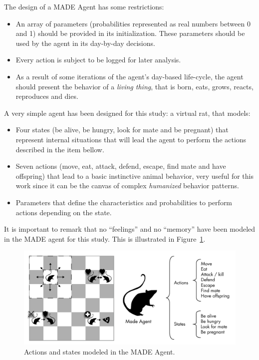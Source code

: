\documentclass[letterpaper]{article}
\begin{document}
The design of a MADE Agent has some restrictions:
\begin{itemize}
\item An array of parameters (probabilities represented as real numbers between 0 and 1) should be provided in its initialization. These parameters should be used by the agent in its day-by-day decisions.
\item Every action is subject to be logged for later analysis.
\item As a result of some iterations of the agent's day-based life-cycle, the agent should present the behavior of a \textit{living thing}, that is born, eats, grows, reacts, reproduces and dies.  
\end{itemize}

A very simple agent has been designed for this study: a virtual
rat, that models:
\begin{itemize}
\item Four states (be alive, be hungry, look for
mate and be pregnant) that represent internal situations that will lead the
agent to perform the actions described in the item bellow.
\item Seven actions (move, eat, attack, defend, escape,
find mate and have offspring) that lead to a basic instinctive animal
behavior, very useful for this work since it can be the canvas of 
complex \textit{humanized} behavior patterns.
\item Parameters that define the characteristics and probabilities to
perform actions depending on the state.
\end{itemize}
It is important to remark that no ``feelings'' and no ``memory''
have been modeled in the MADE agent for this study. This is
illustrated in Figure~\ref{fig:madeAgent}.

\begin{figure}
\begin{center}
\includegraphics[scale=0.35]{img/MadeAgent.pdf}
\caption{Actions and states modeled in the MADE Agent.}
\label{fig:madeAgent}
\end{center}
\end{figure}
\end{document}
